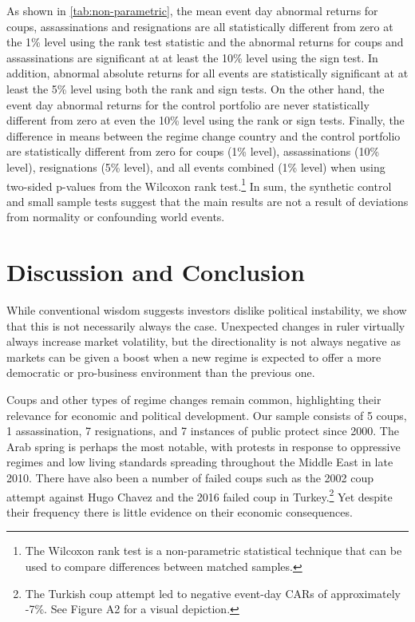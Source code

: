 \documentclass[12pt,final,fleqn]{article}
\theoremstyle{plain}
\begin{document}
As shown in \autoref{tab:non-parametric}, the mean event day abnormal returns for coups, assassinations and resignations are all statistically different from zero at the 1\% level using the rank test statistic and the abnormal returns for coups and assassinations are significant at at least the 10\% level using the sign test. In addition, abnormal absolute returns for all events are statistically significant at at least the 5\% level using both the rank and sign tests. On the other hand, the event day abnormal returns for the control portfolio are never statistically different from zero at even the 10\% level using the rank or sign tests. Finally, the difference in means between the regime change country and the control portfolio are statistically different from zero for coups (1\% level), assassinations (10\% level), resignations (5\% level), and all events combined (1\% level) when using two-sided p-values from the Wilcoxon rank test.\footnote{The Wilcoxon rank test is a non-parametric statistical technique that can be used to compare differences between matched samples.} In sum, the synthetic control and small sample tests suggest that the main results are not a result of deviations from normality or confounding world events.

\section{Discussion and Conclusion}

While conventional wisdom suggests investors dislike political instability, we show that this is not necessarily always the case. Unexpected changes in ruler virtually always increase market volatility, but the directionality is not always negative as markets can be given a boost when a new regime is expected to offer a more democratic or pro-business environment than the previous one. 

Coups and other types of regime changes remain common, highlighting their relevance for economic and political development. Our sample consists of 5 coups, 1 assassination, 7 resignations, and 7 instances of public protect since 2000. The Arab spring is perhaps the most notable, with protests in response to oppressive regimes and low living standards spreading throughout the Middle East in late 2010. There have also been a number of failed coups such as the 2002 coup attempt against Hugo Chavez and the 2016 failed coup in Turkey.\footnote{The Turkish coup attempt led to negative event-day CARs of approximately -7\%. See Figure A2 for a visual depiction.} Yet despite their frequency there is little evidence on their economic consequences.
\end{document}
